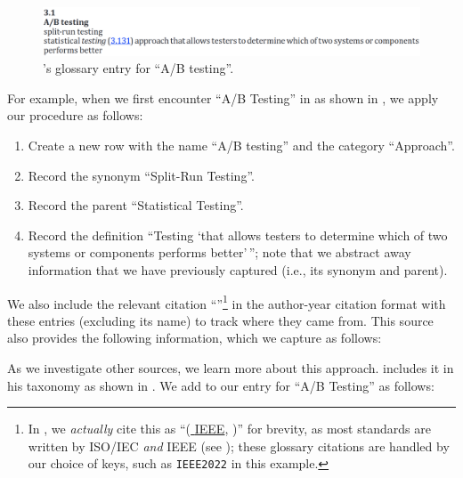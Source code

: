 \begin{figure}[bt!]
    \includegraphics[width=\linewidth]{assets/images/a-b testing.png}
    \caption{ \citet[p.~1]{IEEE2022}'s glossary entry for
        ``A/B testing''.}\label{fig:IEEE-A-B-Testing}
\end{figure}

For example, when we first encounter ``A/B Testing'' in
\citet[p.~1, 36]{IEEE2022} as shown in , we apply
our procedure as follows:
\begin{enumerate}
    \item Create a new row with the name ``A/B testing'' and the category
          ``Approach''.
    \item Record the synonym ``Split-Run Testing''.
    \item Record the parent ``Statistical Testing''.
    \item Record the definition ``Testing `that allows testers to determine
          which of two systems or components performs better'\,''; note that
          we abstract away information that we have previously captured (i.e.,
          its synonym and parent).
\end{enumerate}
\ifnotpaper\newpage\noindent\fi
We also include the relevant citation \ifnotpaper
    ``\citep[pp.~1, 36]{IEEE2022}''\footnote{In \ourApproachGlossary{}, we
        \emph{actually} cite this as ``(\hyperlink{cite.IEEE2022}{
            \textcolor{blue!50!black}{IEEE}},  %
        \citeyear[pp.~1, 36]{IEEE2022})'' for brevity, as most standards are
        written by ISO/IEC \emph{and} IEEE (see );
        these glossary citations are handled by our choice of \BibTeX{} keys,
        such as \texttt{IEEE2022} in this example.}
\else in the author-year citation format \fi with these entries (excluding its
name) to track where they came from. This source also provides the following
information, which we capture as follows:
As we investigate other sources, we learn more about this approach. \ifnotpaper
\else \citeauthor{Firesmith2015} \fi \citet[p.~58]{Firesmith2015} includes it
in his taxonomy as shown in . We add to our
entry for ``A/B Testing'' as follows:


